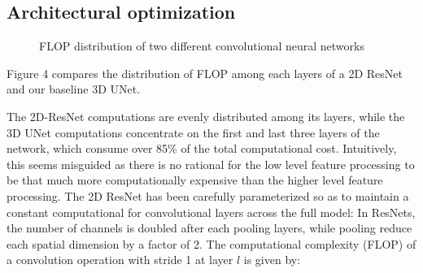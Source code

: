 \documentclass[runningheads]{llncs}
\begin{document}
\subsection{Architectural optimization}

\begin{figure}[h]
\centering
{}%
%

\centering
\caption{FLOP distribution of two different convolutional neural networks}
\end{figure}

Figure 4 compares the distribution of FLOP among each layers of a 2D ResNet \cite{he2016deep} and our baseline 3D UNet.

The 2D-ResNet computations are evenly distributed among its layers, while the 3D UNet computations concentrate on the 
first and last three layers of the network, which consume over 85\% of the total computational cost.
Intuitively, this seems misguided as there is no rational for the low level feature processing to be that much more computationally 
expensive than the higher level feature processing.
The 2D ResNet has been carefully parameterized so as to maintain a constant computational 
for convolutional layers across the full model:
In ResNets, the number of channels is doubled after each pooling layers, 
while pooling reduce each spatial dimension by a factor of 2.
The computational complexity (FLOP) of a convolution operation with stride 1 at layer $l$ is given by:
\end{document}

